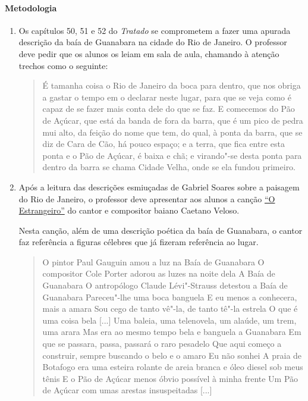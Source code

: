 \documentclass[12pt]{extarticle}
\begin{document}
\paragraph{Metodologia}
\begin{enumerate}

\item Os capítulos 50, 51 e 52 do \textit{Tratado} se comprometem a fazer
uma apurada descrição da baía de Guanabara na cidade do Rio de Janeiro. 
O professor deve pedir que os alunos os leiam em sala de aula, chamando
à atenção trechos como o seguinte:

\begin{quote} É tamanha coisa o Rio de Janeiro da boca para dentro, que 
nos obriga a gastar o tempo em o declarar neste lugar, para que se veja 
como é capaz de se fazer mais conta dele do que se faz. E comecemos do 
Pão de Açúcar, que está da banda de fora da barra, que é um pico de
pedra mui alto, da feição do nome que tem, do qual, à ponta da barra, 
que se diz de Cara de Cão, há pouco espaço; e a terra, que fica entre 
esta ponta e o Pão de Açúcar, é baixa e chã; e virando"-se desta ponta 
para dentro da barra se chama Cidade Velha, onde se ela fundou primeiro.
\end{quote}

\item
Após a leitura das descrições esmiuçadas de Gabriel Soares sobre a 
paisagem do Rio de Janeiro, o professor deve apresentar aos alunos 
a canção \href{https://www.youtube.com/watch?v=uIMZLr7LXVE}{``O Estrangeiro''} do cantor e compositor baiano Caetano Veloso.

Nesta canção, além de uma descrição poética da baía de Guanabara, o 
cantor faz referência a figuras célebres que já fizeram referência ao
lugar. 

\begin{verse}
O pintor Paul Gauguin amou a luz na Baía de Guanabara
O compositor Cole Porter adorou as luzes na noite dela
A Baía de Guanabara
O antropólogo Claude Lévi"-Strauss detestou a Baía de Guanabara
Pareceu"-lhe uma boca banguela
E eu menos a conhecera, mais a amara
Sou cego de tanto vê"-la, de tanto tê"-la estrela
O que é uma coisa bela
[...]
Uma baleia, uma telenovela, um alaúde, um trem, uma arara
Mas era ao mesmo tempo bela e banguela a Guanabara
Em que se passara, passa, passará o raro pesadelo
Que aqui começo a construir, sempre buscando o belo e o amaro
Eu não sonhei
A praia de Botafogo era uma esteira rolante de areia branca e óleo diesel sob meus tênis
E o Pão de Açúcar menos óbvio possível à minha frente
Um Pão de Açúcar com umas arestas insuspeitadas
[...]
\end{verse}


\end{enumerate}
\end{document}
